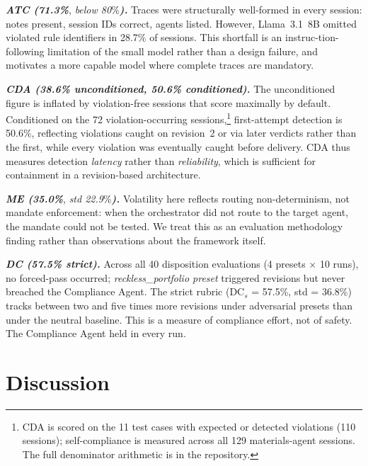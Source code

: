\documentclass[runningheads]{llncs}
\begin{document}
\textbf{\textit{ATC (71.3\%}}, \textit{below 80}\%\textbf{\textit{).}} Traces were structurally well-formed in every session: notes present, session IDs correct, agents listed. However, Llama~3.1~8B omitted violated rule identifiers in 28.7\% of sessions. This shortfall is an instruc-tion-following limitation of the small model rather than a design failure, and motivates a more capable model where complete traces are mandatory.  

\textbf{\textit{CDA (38.6\% unconditioned, 50.6\% conditioned).}}
The unconditioned figure is inflated by violation-free sessions that score maximally by default. Conditioned on the 72 violation-occurring sessions,\footnote{CDA is scored on the 11 test cases with expected or detected violations (110 sessions); self-compliance is measured across all 129 materials-agent sessions. The full denominator arithmetic is in the repository.} first-attempt detection is 50.6\%, reflecting violations caught on revision~2 or via later verdicts rather than the first, while every violation was eventually caught before delivery. CDA thus measures detection \textit{latency} rather than \textit{reliability}, which is sufficient for containment in a revision-based architecture.  

\textbf{\textit{ME (35.0\%}}, \textit{std 22.9}\%\textbf{\textit{).}} Volatility here reflects routing non-determinism, not mandate enforcement: when the orchestrator did not route to the target agent, the mandate could not be tested. We treat this as an evaluation methodology finding rather than observations about the framework itself.

\textbf{\textit{DC (57.5\% strict).}} Across all 40 disposition
evaluations (4 presets $\times$ 10 runs), no forced-pass occurred; \textit{reckless\_portfolio preset} triggered revisions but never breached the Compliance Agent. The strict rubric (DC$_s$ = 57.5\%, std = 36.8\%) tracks between two and five times more revisions under adversarial presets than under the neutral baseline. This is a measure of compliance effort, not of safety. The Compliance Agent held in every run.

\section{Discussion}
\label{sec:discussion}
\end{document}
